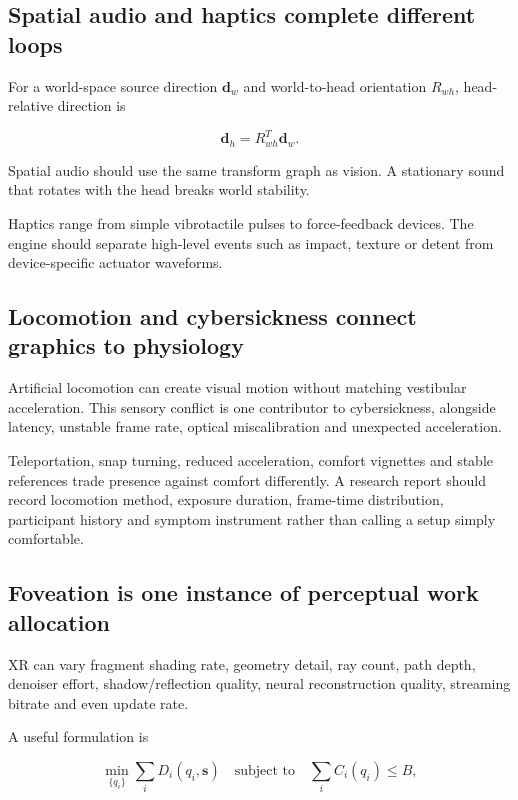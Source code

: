 \subsection{Spatial audio and haptics complete different loops}\label{spatial-audio-and-haptics-complete-different-loops}

For a world-space source direction \(\mathbf d_w\) and world-to-head orientation \(R_{wh}\), head-relative direction is

\[
\mathbf d_h=R_{wh}^{T}\mathbf d_w.
\]

Spatial audio should use the same transform graph as vision. A stationary sound that rotates with the head breaks world stability.

Haptics range from simple vibrotactile pulses to force-feedback devices. The engine should separate high-level events such as impact, texture or detent from device-specific actuator waveforms.

\subsection{Locomotion and cybersickness connect graphics to physiology}\label{locomotion-and-cybersickness-connect-graphics-to-physiology}

Artificial locomotion can create visual motion without matching vestibular acceleration. This sensory conflict is one contributor to cybersickness, alongside latency, unstable frame rate, optical miscalibration and unexpected acceleration.

Teleportation, snap turning, reduced acceleration, comfort vignettes and stable references trade presence against comfort differently. A research report should record locomotion method, exposure duration, frame-time distribution, participant history and symptom instrument rather than calling a setup simply comfortable.

\subsection{Foveation is one instance of perceptual work allocation}\label{foveation-is-one-instance-of-perceptual-work-allocation}

XR can vary fragment shading rate, geometry detail, ray count, path depth, denoiser effort, shadow/reflection quality, neural reconstruction quality, streaming bitrate and even update rate.

A useful formulation is

\[
\min_{\{q_i\}}\sum_i D_i(q_i,\mathbf{s})
\quad\text{subject to}\quad
\sum_i C_i(q_i)\le B,
\]


